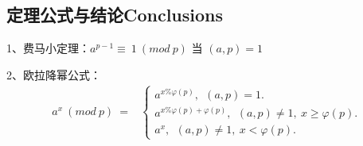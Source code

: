\subsection{定理公式与结论Conclusions}
1、费马小定理：$ a^{p-1} \equiv \ 1 \ (mod \ p) $ \quad 当 $(a,p)=1$ \par
2、欧拉降幂公式：
        \begin{eqnarray}
            a^x \ (mod \ p) \ = &
            \left\{
            \begin{array}{lr}
                a^{x \% \varphi(p)}, \ \ (a,p)=1. \\
                a^{x \% \varphi(p) + \varphi(p)}, \ \ (a,p)\not=1, \ x \ge \varphi(p). \\
                a^x, \ \ (a,p)\not=1, \ x< \varphi(p).
            \end{array}
            \right.
        \end{eqnarray}
